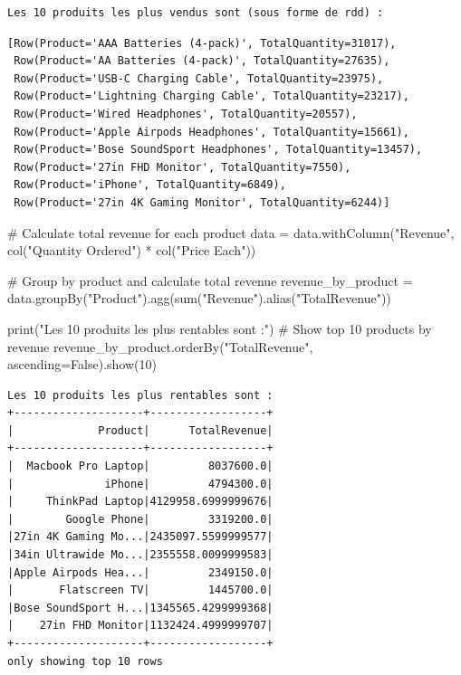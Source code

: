 \documentclass[
  letterpaper,
  DIV=11,
  numbers=noendperiod]{scrartcl}
\newenvironment{Shaded}{\begin{snugshade}}{\end{snugshade}}
\newcommand{\BuiltInTok}[1]{\textcolor[rgb]{0.00,0.23,0.31}{#1}}
\newcommand{\CommentTok}[1]{\textcolor[rgb]{0.37,0.37,0.37}{#1}}
\newcommand{\DecValTok}[1]{\textcolor[rgb]{0.68,0.00,0.00}{#1}}
\newcommand{\NormalTok}[1]{\textcolor[rgb]{0.00,0.23,0.31}{#1}}
\newcommand{\OperatorTok}[1]{\textcolor[rgb]{0.37,0.37,0.37}{#1}}
\newcommand{\StringTok}[1]{\textcolor[rgb]{0.13,0.47,0.30}{#1}}
\newcommand{\VariableTok}[1]{\textcolor[rgb]{0.07,0.07,0.07}{#1}}
\begin{document}
\begin{verbatim}
Les 10 produits les plus vendus sont (sous forme de rdd) :
\end{verbatim}

\begin{verbatim}
[Row(Product='AAA Batteries (4-pack)', TotalQuantity=31017),
 Row(Product='AA Batteries (4-pack)', TotalQuantity=27635),
 Row(Product='USB-C Charging Cable', TotalQuantity=23975),
 Row(Product='Lightning Charging Cable', TotalQuantity=23217),
 Row(Product='Wired Headphones', TotalQuantity=20557),
 Row(Product='Apple Airpods Headphones', TotalQuantity=15661),
 Row(Product='Bose SoundSport Headphones', TotalQuantity=13457),
 Row(Product='27in FHD Monitor', TotalQuantity=7550),
 Row(Product='iPhone', TotalQuantity=6849),
 Row(Product='27in 4K Gaming Monitor', TotalQuantity=6244)]
\end{verbatim}

\begin{Shaded}
\begin{Highlighting}[]
\CommentTok{\# Calculate total revenue for each product}
\NormalTok{data }\OperatorTok{=}\NormalTok{ data.withColumn(}\StringTok{"Revenue"}\NormalTok{, col(}\StringTok{"Quantity Ordered"}\NormalTok{) }\OperatorTok{*}\NormalTok{ col(}\StringTok{"Price Each"}\NormalTok{))}

\CommentTok{\# Group by product and calculate total revenue}
\NormalTok{revenue\_by\_product }\OperatorTok{=}\NormalTok{ data.groupBy(}\StringTok{"Product"}\NormalTok{).agg(}\BuiltInTok{sum}\NormalTok{(}\StringTok{"Revenue"}\NormalTok{).alias(}\StringTok{"TotalRevenue"}\NormalTok{))}

\BuiltInTok{print}\NormalTok{(}\StringTok{"Les 10 produits les plus rentables sont :"}\NormalTok{)}
\CommentTok{\# Show top 10 products by revenue}
\NormalTok{revenue\_by\_product.orderBy(}\StringTok{"TotalRevenue"}\NormalTok{, ascending}\OperatorTok{=}\VariableTok{False}\NormalTok{).show(}\DecValTok{10}\NormalTok{)}
\end{Highlighting}
\end{Shaded}

\begin{verbatim}
Les 10 produits les plus rentables sont :
+--------------------+------------------+
|             Product|      TotalRevenue|
+--------------------+------------------+
|  Macbook Pro Laptop|         8037600.0|
|              iPhone|         4794300.0|
|     ThinkPad Laptop|4129958.6999999676|
|        Google Phone|         3319200.0|
|27in 4K Gaming Mo...|2435097.5599999577|
|34in Ultrawide Mo...|2355558.0099999583|
|Apple Airpods Hea...|         2349150.0|
|       Flatscreen TV|         1445700.0|
|Bose SoundSport H...|1345565.4299999368|
|    27in FHD Monitor|1132424.4999999707|
+--------------------+------------------+
only showing top 10 rows
\end{verbatim}
\end{document}
